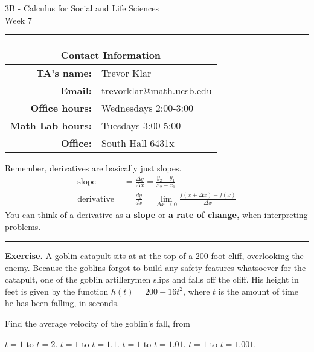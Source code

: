 \documentclass[12pt,letterpaper]{article}
\begin{document}
\thispagestyle{fancy}
\begin{center}
3B - Calculus for Social and Life Sciences\\
Week 7 %
\end{center}

\hrule

\begin{center}
\begin{tabular}{|rl|}
\hline
\multicolumn{2}{|c|}{Contact Information} \\
\hline
\bf{TA's name:} & Trevor Klar \\
\bf{Email:} & trevorklar@math.ucsb.edu \\
\bf{Office hours:} & Wednesdays 2:00-3:00 \\
\bf{Math Lab hours:} & Tuesdays 3:00-5:00 \\
\bf{Office:} & South Hall 6431x \\
\hline
\end{tabular}
\end{center}


Remember, derivatives are basically just slopes.
\begin{align*}
\text{slope }&= \frac{\Delta y}{\Delta x}= \frac{y_2-y_1}{x_2-x_1} \\ 
\text{derivative }&= \frac{dy}{dx} = \lim_{\Delta x\to 0} \frac{f(x+\Delta x)-f(x)}{\Delta x}
\end{align*}
You can think of a derivative as \textbf{a slope} or \textbf{a rate of change,} when interpreting problems. 

\bigskip

\hrule
\textbf{Exercise.} A goblin catapult sits at at the top of a 200 foot cliff, overlooking the enemy. Because the goblins forgot to build any safety features whatsoever for the catapult, one of the goblin artillerymen slips and falls off the cliff. His height in feet is given by the function $h(t)=200-16t^2$, where $t$ is the amount of time he has been falling, in seconds. 

Find the average velocity of the goblin's fall, from
	\begin{problems}
	\problem $t=1$ to $t=2$. 
	\problem $t=1$ to $t=1.1$. 
	\problem $t=1$ to $t=1.01$. 
	\problem $t=1$ to $t=1.001$. 	
	\end{problems}
	
\end{document}

